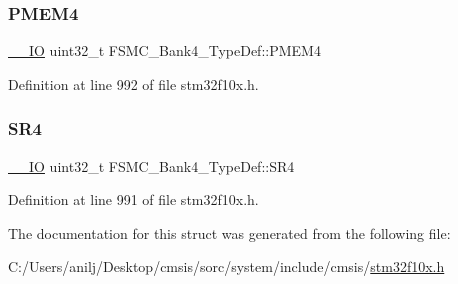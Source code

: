 \subsubsection{\texorpdfstring{P\+M\+E\+M4}{PMEM4}}
{\footnotesize\ttfamily \hyperlink{core__sc300_8h_aec43007d9998a0a0e01faede4133d6be}{\+\_\+\+\_\+\+IO} uint32\+\_\+t F\+S\+M\+C\+\_\+\+Bank4\+\_\+\+Type\+Def\+::\+P\+M\+E\+M4}



Definition at line 992 of file stm32f10x.\+h.

\mbox{\label{struct_f_s_m_c___bank4___type_def_a1e0f09be7fa48bb7b14233866da1dd9f}} 
\subsubsection{\texorpdfstring{S\+R4}{SR4}}
{\footnotesize\ttfamily \hyperlink{core__sc300_8h_aec43007d9998a0a0e01faede4133d6be}{\+\_\+\+\_\+\+IO} uint32\+\_\+t F\+S\+M\+C\+\_\+\+Bank4\+\_\+\+Type\+Def\+::\+S\+R4}



Definition at line 991 of file stm32f10x.\+h.



The documentation for this struct was generated from the following file\+:\begin{DoxyCompactItemize}
\item 
C\+:/\+Users/anilj/\+Desktop/cmsis/sorc/system/include/cmsis/\hyperlink{stm32f10x_8h}{stm32f10x.\+h}\end{DoxyCompactItemize}
